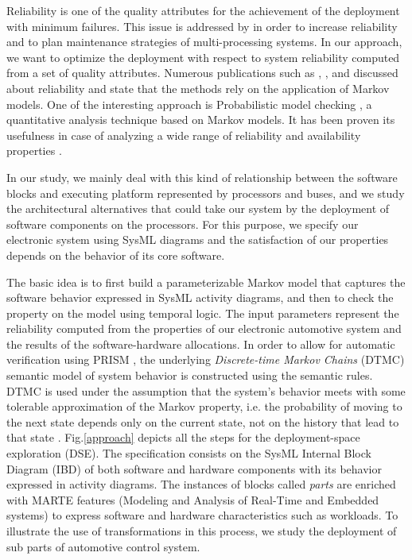 \documentclass[3p,times,procedia,authoryear,round]{elsarticle}
\begin{document}
Reliability is one of the quality attributes for the achievement of the deployment with minimum failures. This issue is addressed by \citep{Baouya2016} in order to increase reliability and to plan maintenance strategies of multi-processing systems. In our approach, we want to optimize the deployment with respect to system reliability computed from a set of quality attributes.  Numerous publications such as \citep{Zhang2013261}, \citep{Peng2014}, \citep{Lu201595} and \citep{Cherfi201442} discussed about reliability and state that the methods rely on the application of Markov models. One of the interesting approach is Probabilistic model checking \citep{Kwiatkowska},  a quantitative analysis technique based on Markov models.  It has been proven its usefulness in case of analyzing a wide range of reliability and availability properties \citep{Zhang2013261} \citep{Hoque2014}. 


In our study, we mainly deal with  this kind of relationship between the software blocks and executing platform represented by processors and buses, and we study the architectural alternatives that could take our system by the deployment of software components on the processors. For this purpose, we specify our electronic system using SysML diagrams \citep{OMG} and the satisfaction of our properties depends on the behavior of its core software. 


The basic idea is to first build a  parameterizable Markov model \citep{Filieri2016} that captures the software behavior expressed in SysML activity diagrams, and then to check the property on the model using temporal logic. The input parameters represent the reliability computed from the properties of our electronic automotive system and the results of the software-hardware allocations. In order to allow for automatic verification using PRISM \citep{Kwiatkowska}, the underlying \emph{Discrete-time Markov Chains} (DTMC) semantic model of system behavior is constructed using the semantic rules. DTMC is used under the assumption that the system’s behavior meets with some tolerable approximation of the Markov property, i.e. the probability of moving to the next state  depends only on the current state, not on the history that lead to that state \citep{KP12}.  Fig.\ref{approach} depicts all the steps for the deployment-space exploration (DSE). The specification consists on the SysML Internal Block Diagram (IBD) of both software and hardware components with its behavior expressed in activity diagrams. The instances of blocks called \emph{parts} are enriched with MARTE features (Modeling and Analysis of Real-Time and Embedded systems) \citep{Mallet} to express software and hardware characteristics such as workloads. To illustrate the use of transformations in this process, we study the deployment of sub parts of automotive control system. 
\end{document}
